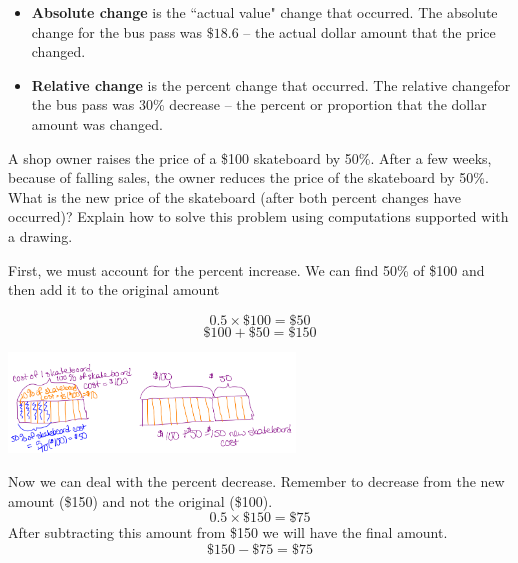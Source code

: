 \documentclass{ximera}
\begin{document}
\begin{itemize}
    \item \textbf{Absolute change} is the ``actual value" change that occurred. The absolute change for the bus pass was $\$18.6$ -- the actual dollar amount that the price changed. 
    \item \textbf{Relative change} is the percent change that occurred. The relative changefor the bus pass was 30\% decrease -- the percent or proportion that the dollar amount was changed. 
\end{itemize}



\begin{example}
A shop owner raises the price of a \$100 skateboard by 50\%. After a few weeks, because of falling sales, the owner reduces the price of the skateboard by 50\%.
What is the new price of the skateboard (after both percent changes have occurred)? Explain how to solve this problem using computations supported with a drawing.

\begin{explanation}
  First, we must account for the percent increase. We can find 50\% of \$100 and then add it to the original amount

$$
0.5 \times \$100 = \$50
$$
$$
\$ 100 + \$50 = \$ 150
$$

\begin{image}
    \includegraphics[width=3in]{skateboard1.png}
\end{image}

Now we can deal with the percent decrease. Remember to decrease from the new amount (\$150) and not the original (\$100).
$$
0.5 \times \$150 = \$75
$$
After subtracting this amount from \$150 we will have the final amount.
$$
\$ 150 - \$75 = \$ 75
$$


\end{explanation}
\end{example}
\end{document}
